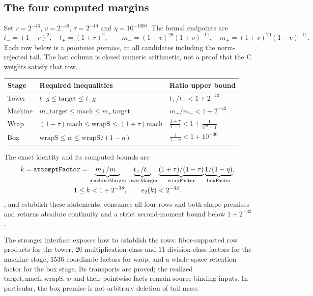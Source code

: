 \subsection{The four computed margins}
Set $r=2^{-46}$, $v=2^{-48}$, $\tau=2^{-40}$ and
$\eta=10^{-1000}$. The formal endpoints are
\[
 t_-=(1-r)^2,\quad t_+=(1+r)^2,\qquad
 m_-=(1-v)^{20}(1+v)^{-11},\quad
 m_+=(1+v)^{20}(1-v)^{-11}.
\]
Each row below is a \emph{pointwise premise}, at all candidates including
the norm-rejected tail. The last column is closed numeric arithmetic,
not a proof that the C weights satisfy that row.

\begin{center}\small
\begin{tabular}{lll}
\toprule
Stage & Required inequalities & Ratio upper bound \\
\midrule
Tower & $t_-g\leq\mathrm{target}\leq t_+g$
 & $t_+/t_-<1+2^{-43}$ \\
Machine & $m_-\mathrm{target}\leq\mathrm{mach}\leq m_+\mathrm{target}$
 & $m_+/m_-<1+2^{-42}$ \\
Wrap & $(1-\tau)\mathrm{mach}\leq\mathrm{wrapS}\leq(1+\tau)\mathrm{mach}$
 & $\frac{1+\tau}{1-\tau}<1+\frac1{2^{39}-1}$ \\
Box & $\mathrm{wrapS}\leq w\leq\mathrm{wrapS}/(1-\eta)$
 & $\frac1{1-\eta}<1+10^{-30}$ \\
\bottomrule
\end{tabular}
\end{center}
The exact identity and its computed bounds are
\begin{equation}\label{eq:factor}
 \begin{gathered}
 k=\code{attemptFactor}
 =\underbrace{m_+/m_-}_{\mathrm{machineMargin}}
  \underbrace{t_+/t_-}_{\mathrm{towerMargin}}
  \underbrace{(1+\tau)/(1-\tau)}_{\mathrm{wrapFactor}}
  \underbrace{1/(1-\eta)}_{\mathrm{boxFactor}},\\
 1\leq k<1+2^{-38},\qquad e_2(k)<2^{-32}.
 \end{gathered}
\end{equation}
,  and
 establish these statements.
 consumes all four rows and both shape
premises and returns absolute continuity and a strict second-moment
bound below $1+2^{-32}$.

The stronger  interface exposes how to establish
the rows: fiber-supported row products for the tower, $20$
multiplication-class and $11$ division-class factors for the machine
stage, $1536$ coordinate factors for wrap, and a whole-space retention
factor for the box stage. Its transports are proved; the realized
$\mathrm{target},\mathrm{mach},\mathrm{wrapS},w$ and their pointwise
facts remain source-binding inputs. In particular, the box premise is
not arbitrary deletion of tail mass.

